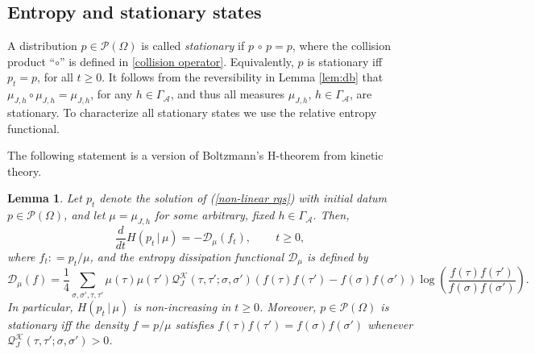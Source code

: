 \documentclass[11pt,reqno]{amsart}
\numberwithin{equation}{section}
\numberwithin{figure}{section}
\newtheorem{lemma}[theorem]{Lemma}
\newcommand{\1}{\mathds{1}}
\newcommand{\tc}{\,|\,}
\let\O=\Omega
\let\G=\Gamma
\newcommand{\cA}{\ensuremath{\mathcal A}}
\newcommand{\cK}{\ensuremath{\mathcal K}}
\newcommand{\cP}{\ensuremath{\mathcal P}}
\newcommand{\cQ}{\ensuremath{\mathcal Q}}
\begin{document}
\subsection{Entropy and stationary states}
A distribution \(p \in \mathcal{P}(\Omega)\) is called {\em stationary} if  $p\,\circ\, p=p$, where the collision product ``$\circ$'' is defined in \eqref{collision operator}. Equivalently, $p$ is stationary iff $p_t=p$, for all $t\ge0$.  It follows from the reversibility in Lemma \ref{lem:db} that $\mu_{J,h}\circ \mu_{J,h}=\mu_{J,h}$, for any $h\in\G_\cA$, and thus all measures $\mu_{J,h}$, $h\in\G_\cA$, are stationary. To characterize all stationary states we use the relative entropy functional. 


 The following statement is a version of Boltzmann's H-theorem from kinetic theory. 
\begin{lemma}\label{H-theorem}  
Let $p_t$ denote the solution of (\ref{non-linear rqs}) with initial datum $p\in\cP(\O)$, and let $\mu = \mu_{J,h}$ for some arbitrary, fixed  $h\in\G_\cA$. Then,  
%
\begin{equation} \label{H-theorema}
    \frac{d}{dt} H(p_t\tc\mu) = -\mathcal{D}_{\mu}(f_t), %
    \,\qquad t\ge0, 
\end{equation}
where  $f_t: = p_t/\mu$, %
and the entropy dissipation functional \(\mathcal{D}_{\mu}\) is  defined by 
\begin{equation} \label{dissipation energy nonlin}  
   \mathcal{D}_{\mu}(f)  = \frac{1}{4} \sum_{\sigma, \sigma', \tau, \tau'}\mu(\tau) \mu(\tau') \mathcal{Q}_J^\cK(\tau, \tau'; \sigma, \sigma') \left(f(\tau)f(\tau') - f(\sigma)f(\sigma')\right) \log\left(\frac{f(\tau)f(\tau')}{f(\sigma)f(\sigma')}\right).
\end{equation}
In particular,  $H(p_t\tc \mu)$ is non-increasing in $t\ge 0$. Moreover, $p\in \mathcal{P}(\Omega)$ is stationary iff the density $f=p/\mu$ satisfies $ f(\tau)f(\tau') = f(\sigma)f(\sigma')$ whenever $\mathcal{Q}_J^\cK(\tau, \tau'; \sigma, \sigma')>0$. 
 \end{lemma}
\end{document}
